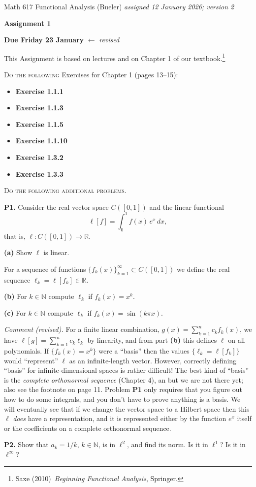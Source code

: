 \documentclass[12pt]{amsart}
\newcommand{\NN}{\mathbb{N}}
\newcommand{\RR}{\mathbb{R}}
\newcommand{\prob}[1]{\bigskip\noindent\textbf{#1.}\quad }
\newcommand{\epart}[1]{\medskip\noindent\textbf{(#1)}\quad }
\begin{document}
\scriptsize \noindent Math 617 Functional Analysis (Bueler) \hfill \emph{assigned 12 January 2026; {\color{red} version 2}}
\normalsize\medskip

\Large\centerline{\textbf{Assignment 1}}
\large
\medskip

\centerline{\textbf{Due Friday 23 January} {\color{red} $\leftarrow$ \emph{revised}}}
\medskip
\normalsize

\thispagestyle{empty}

\bigskip
\noindent This Assignment is based on lectures and on Chapter 1 of our textbook.\footnote{Saxe (2010)~\emph{Beginning Functional Analysis}, Springer.}


\bigskip
\noindent \textsc{Do the following} Exercises for Chapter 1 (pages 13--15):

\begin{itemize}
\item \textbf{Exercise 1.1.1}
\item \textbf{Exercise 1.1.3}
\item \textbf{Exercise 1.1.5}
\item \textbf{Exercise 1.1.10}
\item \textbf{Exercise 1.3.2}
\item \textbf{Exercise 1.3.3}
\end{itemize}


\medskip
\noindent \textsc{Do the following additional problems.}

\prob{P1}  Consider the real vector space $C([0,1])$ and the linear functional
	$$\ell[f] = \int_0^1 f(x) \,e^x\, dx,$$
that is, $\ell : C([0,1]) \to \RR$.

\epart{a} Show $\ell$ is linear.

\medskip
\noindent  For a sequence of functions $\{f_k(x)\}_{k=1}^\infty \subset C([0,1])$ we define the real sequence $\ell_k = \ell[f_k] \in \RR$.

\epart{b} For $k\in \NN$ compute $\ell_k$ if $f_k(x) = x^k$.

\epart{c} For $k\in \NN$ compute $\ell_k$ if $f_k(x) = \sin(k\pi x)$.

\bigskip
\noindent  \emph{Comment (revised).}  For a finite linear combination, $g(x)=\sum_{k=1}^n c_k f_k(x)$, we have $\ell[g] = \sum_{k=1}^n c_k \ell_k$ by linearity, and from part \textbf{(b)} this defines $\ell$ on all polynomials.  If $\{f_k(x)=x^k\}$ were a ``basis'' then the values $\{\ell_k = \ell[f_k]\}$ would ``represent'' $\ell$ as an infinite-length vector.  However, correctly defining ``basis'' for infinite-dimensional spaces is rather difficult!  The best kind of ``basis'' is the \emph{complete orthonormal sequence} (Chapter 4), an but we are not there yet; also see the footnote on page 11.  Problem \textbf{P1} only requires that you figure out how to do some integrals, and you don't have to prove anything is a basis.  We will eventually see that if we change the vector space to a Hilbert space then this $\ell$ \emph{does} have a representation, and it is represented either by the function $e^x$ itself or the coefficients on a complete orthonormal sequence.

\prob{P2}  Show that $a_k = 1/k$, $k\in\NN$, is in $\ell^2$, and find its norm.  Is it in $\ell^1$?  Is it in $\ell^\infty$?

\end{document}
